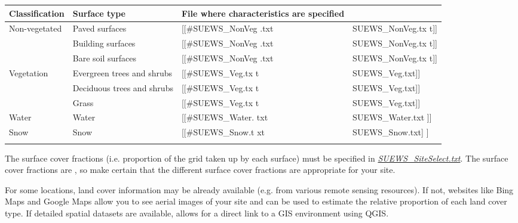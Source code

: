 \documentclass[letterpaper,10pt,english]{sphinxmanual}
\begin{document}
\begin{savenotes}\sphinxattablestart
\centering
\begin{tabulary}{\linewidth}[t]{|T|T|T|T|}
\hline
\sphinxstyletheadfamily 
Classification
&\sphinxstyletheadfamily 
Surface type
&\sphinxstyletheadfamily 
File where
characteristics
are specified
&\sphinxstyletheadfamily \\
\hline
Non-vegetated
&
Paved surfaces
&
{[}{[}\#SUEWS\_NonVeg
.txt
&
SUEWS\_NonVeg.tx
t{]}{]}
\\
\hline&
Building
surfaces
&
{[}{[}\#SUEWS\_NonVeg
.txt
&
SUEWS\_NonVeg.tx
t{]}{]}
\\
\hline&
Bare soil
surfaces
&
{[}{[}\#SUEWS\_NonVeg
.txt
&
SUEWS\_NonVeg.tx
t{]}{]}
\\
\hline
Vegetation
&
Evergreen trees
and shrubs
&
{[}{[}\#SUEWS\_Veg.tx
t
&
SUEWS\_Veg.txt{]}{]}
\\
\hline&
Deciduous trees
and shrubs
&
{[}{[}\#SUEWS\_Veg.tx
t
&
SUEWS\_Veg.txt{]}{]}
\\
\hline&
Grass
&
{[}{[}\#SUEWS\_Veg.tx
t
&
SUEWS\_Veg.txt{]}{]}
\\
\hline
Water
&
Water
&
{[}{[}\#SUEWS\_Water.
txt
&
SUEWS\_Water.txt
{]}{]}
\\
\hline
Snow
&
Snow
&
{[}{[}\#SUEWS\_Snow.t
xt
&
SUEWS\_Snow.txt{]}
{]}
\\
\hline&&&\\
\hline
\end{tabulary}
\par
\sphinxattableend\end{savenotes}

The surface cover fractions (i.e. proportion of the grid taken up by
each surface) must be specified in
{\hyperref[\detokenize{prepare-to-run-the-model:SUEWS_SiteSelect.txt}]{\emph{SUEWS\_SiteSelect.txt}}}. The surface cover
fractions are , so make certain that the different surface
cover fractions are appropriate for your site.

For some locations, land cover information may be already available
(e.g. from various remote sensing resources). If not, websites like Bing
Maps and Google Maps allow you to see aerial images of your site and can
be used to estimate the relative proportion of each land cover type. If
detailed spatial datasets are available,
 allows for a direct link
to a GIS environment using QGIS.
\end{document}

